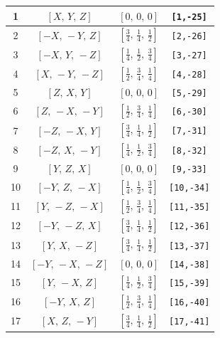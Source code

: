 \documentclass[fleqn,8pt]{jsarticle}
\begin{document}
\begin{longtable}{cccc}
1 & $\left[ X,\, Y,\, Z \right]$ & $\left[ 0,\, 0,\, 0 \right]$ & {\tt [1,-25]} \\ \hline
2 & $\left[ - X,\, - Y,\, Z \right]$ & $\left[ \frac{3}{4},\, \frac{1}{4},\, \frac{1}{2} \right]$ & {\tt [2,-26]} \\ \hline
3 & $\left[ - X,\, Y,\, - Z \right]$ & $\left[ \frac{1}{4},\, \frac{1}{2},\, \frac{3}{4} \right]$ & {\tt [3,-27]} \\ \hline
4 & $\left[ X,\, - Y,\, - Z \right]$ & $\left[ \frac{1}{2},\, \frac{3}{4},\, \frac{1}{4} \right]$ & {\tt [4,-28]} \\ \hline
5 & $\left[ Z,\, X,\, Y \right]$ & $\left[ 0,\, 0,\, 0 \right]$ & {\tt [5,-29]} \\ \hline
6 & $\left[ Z,\, - X,\, - Y \right]$ & $\left[ \frac{1}{2},\, \frac{3}{4},\, \frac{1}{4} \right]$ & {\tt [6,-30]} \\ \hline
7 & $\left[ - Z,\, - X,\, Y \right]$ & $\left[ \frac{3}{4},\, \frac{1}{4},\, \frac{1}{2} \right]$ & {\tt [7,-31]} \\ \hline
8 & $\left[ - Z,\, X,\, - Y \right]$ & $\left[ \frac{1}{4},\, \frac{1}{2},\, \frac{3}{4} \right]$ & {\tt [8,-32]} \\ \hline
9 & $\left[ Y,\, Z,\, X \right]$ & $\left[ 0,\, 0,\, 0 \right]$ & {\tt [9,-33]} \\ \hline
10 & $\left[ - Y,\, Z,\, - X \right]$ & $\left[ \frac{1}{4},\, \frac{1}{2},\, \frac{3}{4} \right]$ & {\tt [10,-34]} \\ \hline
11 & $\left[ Y,\, - Z,\, - X \right]$ & $\left[ \frac{1}{2},\, \frac{3}{4},\, \frac{1}{4} \right]$ & {\tt [11,-35]} \\ \hline
12 & $\left[ - Y,\, - Z,\, X \right]$ & $\left[ \frac{3}{4},\, \frac{1}{4},\, \frac{1}{2} \right]$ & {\tt [12,-36]} \\ \hline
13 & $\left[ Y,\, X,\, - Z \right]$ & $\left[ \frac{3}{4},\, \frac{1}{4},\, \frac{1}{2} \right]$ & {\tt [13,-37]} \\ \hline
14 & $\left[ - Y,\, - X,\, - Z \right]$ & $\left[ 0,\, 0,\, 0 \right]$ & {\tt [14,-38]} \\ \hline
15 & $\left[ Y,\, - X,\, Z \right]$ & $\left[ \frac{1}{4},\, \frac{1}{2},\, \frac{3}{4} \right]$ & {\tt [15,-39]} \\ \hline
16 & $\left[ - Y,\, X,\, Z \right]$ & $\left[ \frac{1}{2},\, \frac{3}{4},\, \frac{1}{4} \right]$ & {\tt [16,-40]} \\ \hline
17 & $\left[ X,\, Z,\, - Y \right]$ & $\left[ \frac{3}{4},\, \frac{1}{4},\, \frac{1}{2} \right]$ & {\tt [17,-41]} \\ \hline

\end{longtable}
\end{document}
